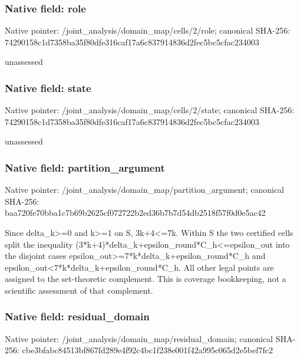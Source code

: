 \documentclass[10pt,a4paper]{article}
\begin{document}
\subsubsection{Native field: role}
Native pointer: /joint\_\allowbreak{}analysis/domain\_\allowbreak{}map/cells/2/role; canonical SHA-256: 74290158c1d7358ba35f80dfe316caf17a6c837914836d2fec5bc5cfac234003

\begingroup\raggedright\sloppy unassessed\par\endgroup

\subsubsection{Native field: state}
Native pointer: /joint\_\allowbreak{}analysis/domain\_\allowbreak{}map/cells/2/state; canonical SHA-256: 74290158c1d7358ba35f80dfe316caf17a6c837914836d2fec5bc5cfac234003

\begingroup\raggedright\sloppy unassessed\par\endgroup

\subsubsection{Native field: partition\_\allowbreak{}argument}
Native pointer: /joint\_\allowbreak{}analysis/domain\_\allowbreak{}map/partition\_\allowbreak{}argument; canonical SHA-256: baa720fe70bba1c7b69b2625cf072722b2ed36b7b7d54db2518f57f0d0e5ac42

\begingroup\raggedright\sloppy Since delta\_\allowbreak{}k>=\allowbreak{}0 and k>=\allowbreak{}1 on S,\allowbreak{} 3k+4<=\allowbreak{}7k. Within S the two certified cells split the inequality (3*k+4)*delta\_\allowbreak{}k+epsilon\_\allowbreak{}round*C\_\allowbreak{}h<=\allowbreak{}epsilon\_\allowbreak{}out into the disjoint cases epsilon\_\allowbreak{}out>=\allowbreak{}7*k*delta\_\allowbreak{}k+epsilon\_\allowbreak{}round*C\_\allowbreak{}h and epsilon\_\allowbreak{}out<7*k*delta\_\allowbreak{}k+epsilon\_\allowbreak{}round*C\_\allowbreak{}h. All other legal points are assigned to the set-theoretic complement. This is coverage bookkeeping,\allowbreak{} not a scientific assessment of that complement.\par\endgroup

\subsubsection{Native field: residual\_\allowbreak{}domain}
Native pointer: /joint\_\allowbreak{}analysis/domain\_\allowbreak{}map/residual\_\allowbreak{}domain; canonical SHA-256: cbe3bfabc84513bf867fd289e4f92c4bc1f238e001f42a995c065d2e5bef7fc2
\end{document}
